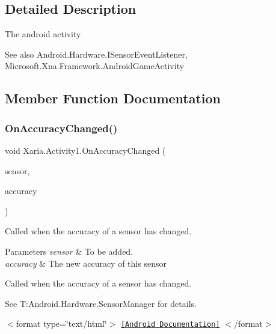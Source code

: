 \subsection{Detailed Description}
The android activity 

\begin{DoxySeeAlso}{See also}
Android.\+Hardware.\+I\+Sensor\+Event\+Listener, Microsoft.\+Xna.\+Framework.\+Android\+Game\+Activity


\end{DoxySeeAlso}


\subsection{Member Function Documentation}
\mbox{\label{classXaria_1_1Activity1_aadf94688926beaaf66d1000b73662a43}} 
\subsubsection{\texorpdfstring{On\+Accuracy\+Changed()}{OnAccuracyChanged()}}
{\footnotesize\ttfamily void Xaria.\+Activity1.\+On\+Accuracy\+Changed (\begin{DoxyParamCaption}\item[{Sensor}]{sensor,  }\item[{Sensor\+Status}]{accuracy }\end{DoxyParamCaption})\hspace{0.3cm}{\ttfamily [inline]}}



Called when the accuracy of a sensor has changed. 


\begin{DoxyParams}{Parameters}
{\em sensor} & To be added.\\
\hline
{\em accuracy} & The new accuracy of this sensor\\
\hline
\end{DoxyParams}


Called when the accuracy of a sensor has changed. 

See {\ttfamily T\+:\+Android.\+Hardware.\+Sensor\+Manager} for details.

$<$format type=\char`\"{}text/html\char`\"{}$>$ \href{http://developer.android.com/reference/android/hardware/SensorEventListener.html#onAccuracyChanged(android.hardware.Sensor, int)}{\tt \mbox{[}Android Documentation\mbox{]}} $<$/format$>$ 

